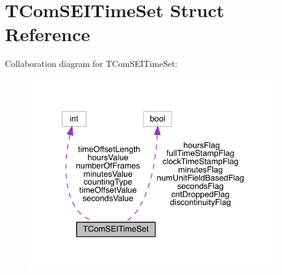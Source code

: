 \hypertarget{struct_t_com_s_e_i_time_set}{}\section{T\+Com\+S\+E\+I\+Time\+Set Struct Reference}
\label{struct_t_com_s_e_i_time_set}


Collaboration diagram for T\+Com\+S\+E\+I\+Time\+Set\+:
\nopagebreak
\begin{figure}[H]
\begin{center}
\leavevmode
\includegraphics[width=302pt]{d5/d41/struct_t_com_s_e_i_time_set__coll__graph}
\end{center}
\end{figure}
